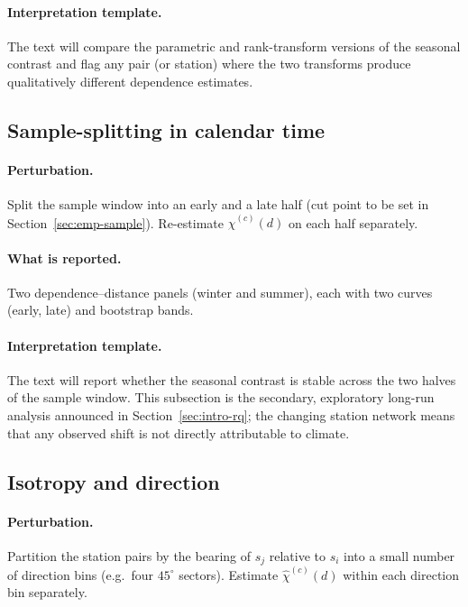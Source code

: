 \paragraph{Interpretation template.}
The text will compare the parametric and rank-transform versions
of the seasonal contrast and flag any pair (or station) where the
two transforms produce qualitatively different dependence
estimates.

\subsection{Sample-splitting in calendar
time}\label{sec:rob-period}

\paragraph{Perturbation.}
Split the sample window into an early and a late half (cut point
to be set in Section~\ref{sec:emp-sample}). Re-estimate
\(\widehat\chi^{(c)}(d)\) on each half separately.

\paragraph{What is reported.}
Two dependence--distance panels (winter and summer), each with
two curves (early, late) and bootstrap bands.

\paragraph{Interpretation template.}
The text will report whether the seasonal contrast is stable
across the two halves of the sample window. This subsection is
the secondary, exploratory long-run analysis announced in
Section~\ref{sec:intro-rq}; the changing station network means
that any observed shift is not directly attributable to climate.

\subsection{Isotropy and direction}\label{sec:rob-direction}

\paragraph{Perturbation.}
Partition the station pairs by the bearing of \(s_j\) relative to
\(s_i\) into a small number of direction bins (e.g.\ four \(45^\circ\)
sectors). Estimate \(\widehat\chi^{(c)}(d)\) within each direction
bin separately.

